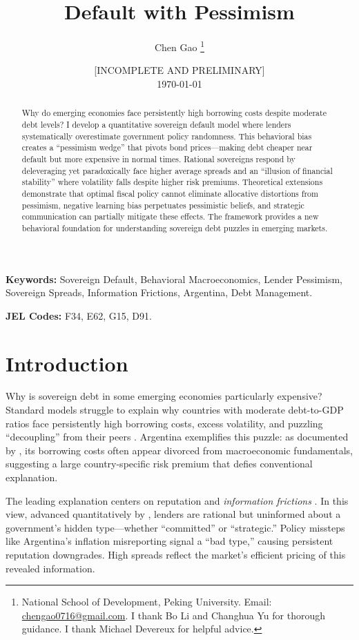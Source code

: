 \documentclass[12pt]{article}
\title{Default with Pessimism}
\author{Chen Gao \thanks{National School of Development, Peking University. Email: \url{chengao0716@gmail.com}. I thank Bo Li and Changhua Yu for thorough guidance. I thank Michael Devereux for helpful advice.}}
\date{{\color{red} [INCOMPLETE AND PRELIMINARY]} \\ \today}
\theoremstyle{plain}
\begin{document}
\maketitle

\begin{abstract}
	Why do emerging economies face persistently high borrowing costs despite moderate debt levels? I develop a quantitative sovereign default model where lenders systematically overestimate government policy randomness. This behavioral bias creates a ``pessimism wedge'' that pivots bond prices---making debt cheaper near default but more expensive in normal times. Rational sovereigns respond by deleveraging yet paradoxically face higher average spreads and an ``illusion of financial stability'' where volatility falls despite higher risk premiums. Theoretical extensions demonstrate that optimal fiscal policy cannot eliminate allocative distortions from pessimism, negative learning bias perpetuates pessimistic beliefs, and strategic communication can partially mitigate these effects. The framework provides a new behavioral foundation for understanding sovereign debt puzzles in emerging markets.
\end{abstract}

\noindent \textbf{Keywords:} Sovereign Default, Behavioral Macroeconomics, Lender Pessimism, Sovereign Spreads, Information Frictions, Argentina, Debt Management.

\noindent \textbf{JEL Codes:} F34, E62, G15, D91.

\clearpage

\section{Introduction}
\label{sec:intro}

Why is sovereign debt in some emerging economies particularly expensive?
Standard models struggle to explain why countries with moderate debt-to-GDP
ratios face persistently high borrowing costs, excess volatility, and puzzling
``decoupling'' from their peers \citep{TomzWright2013,
	MeyerReinhartTrebesch2022}. Argentina exemplifies this puzzle: as documented by
\citep{MorelliMoretti2023}, its borrowing costs often appear divorced from
macroeconomic fundamentals, suggesting a large country-specific risk premium
that defies conventional explanation.

The leading explanation centers on reputation and \textit{information
	frictions} \citep{ColeDowEnglish1995}. In this view, advanced quantitatively by
\citep{MorelliMoretti2023}, lenders are rational but uninformed about a
government's hidden type---whether ``committed'' or ``strategic.'' Policy
missteps like Argentina's inflation misreporting signal a ``bad type,'' causing
persistent reputation downgrades. High spreads reflect the market's efficient
pricing of this revealed information.
\end{document}
